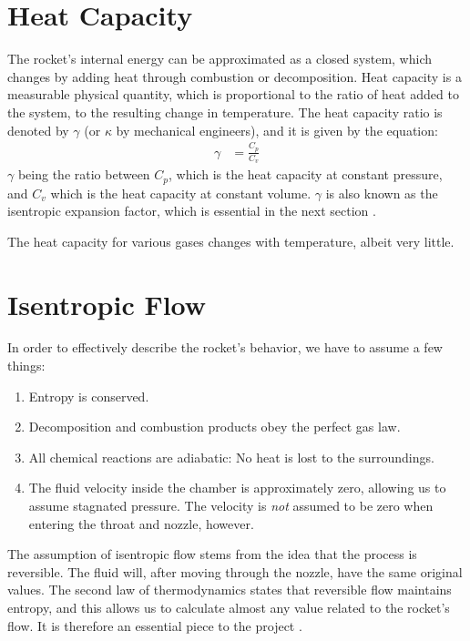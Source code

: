 \section{Heat Capacity}
	
	The rocket's internal energy can be approximated as a closed system, which changes by adding heat through combustion or decomposition. Heat capacity is a measurable physical quantity, which is proportional to the ratio of heat added to the system, to the resulting change in temperature. The heat capacity ratio is denoted by $\gamma$ (or $\kappa$ by mechanical engineers), and it is given by the equation:
	 \begin{align}
		 \gamma &= \frac{C_p}{C_v}
	 \end{align}
	$\gamma$ being the ratio between $C_p$, which is the heat capacity at constant pressure, and $C_v$ which is the heat capacity at constant volume. $\gamma$ is also known as the isentropic expansion factor, which is essential in the next section \cite{IntroFluidRobert}. 
	
	The heat capacity for various gases changes with temperature, albeit very little. 

\section{Isentropic Flow}

	In order to effectively describe the rocket's behavior, we have to assume a few things:
	\begin{enumerate}[topsep=0pt,itemsep=-1ex,partopsep=1ex,parsep=1ex]
		\item{Entropy is conserved.}
		\item{Decomposition and combustion products obey the perfect gas law.}
		\item{All chemical reactions are adiabatic: No heat is lost to the surroundings.}
		\item{The fluid velocity inside the chamber is approximately zero, allowing us to assume stagnated pressure. The velocity is \emph{not} assumed to be zero when entering the throat and nozzle, however.}
	\end{enumerate}

	The assumption of isentropic flow stems from the idea that the process is reversible. The fluid will, after moving through the nozzle, have the same original values. The second law of thermodynamics states that reversible flow maintains entropy, and this allows us to calculate almost any value related to the rocket's flow. It is therefore an essential piece to the project \cite{nakkanozz}.

